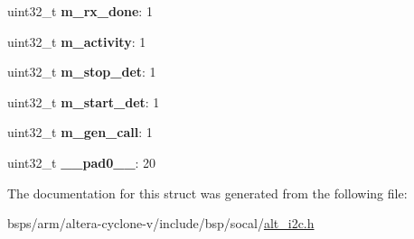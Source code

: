 \begin{DoxyCompactItemize}
uint32\+\_\+t {\bfseries m\+\_\+rx\+\_\+done}\+: 1
\item 
\mbox{\label{structALT__I2C__INTR__MSK__s_a411139f6a137e0d47b8ff1447d64ae3e}} 
uint32\+\_\+t {\bfseries m\+\_\+activity}\+: 1
\item 
\mbox{\label{structALT__I2C__INTR__MSK__s_ae9f7740836fd06842c0daae242014c17}} 
uint32\+\_\+t {\bfseries m\+\_\+stop\+\_\+det}\+: 1
\item 
\mbox{\label{structALT__I2C__INTR__MSK__s_a4c643ca0e580a88ca2827d443dfa5ec4}} 
uint32\+\_\+t {\bfseries m\+\_\+start\+\_\+det}\+: 1
\item 
\mbox{\label{structALT__I2C__INTR__MSK__s_a7b2e6d2e4b0f8e81378dd45712759dda}} 
uint32\+\_\+t {\bfseries m\+\_\+gen\+\_\+call}\+: 1
\item 
\mbox{\label{structALT__I2C__INTR__MSK__s_a2e7663eea104a212ff490adbcdc2be63}} 
uint32\+\_\+t {\bfseries \+\_\+\+\_\+pad0\+\_\+\+\_\+}\+: 20
\end{DoxyCompactItemize}


The documentation for this struct was generated from the following file\+:\begin{DoxyCompactItemize}
\item 
bsps/arm/altera-\/cyclone-\/v/include/bsp/socal/\mbox{\hyperlink{socal_2alt__i2c_8h}{alt\+\_\+i2c.\+h}}\end{DoxyCompactItemize}
